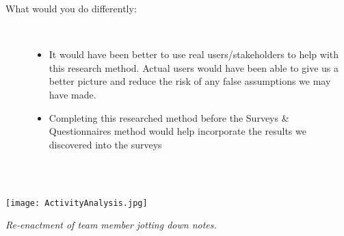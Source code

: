 \documentclass{article}
\begin{document}
\begin{description}
    \item[What would you do differently:]
    \newline \,
    \begin{itemize}
        \item It would have been better to use real users/stakeholders to help with this research 
        method. Actual users would have been able to give us a better picture and reduce the risk of 
        any false assumptions we may have made. 
        \item Completing this researched method before the Surveys & Questionnaires method would help 
        incorporate the results we discovered into the surveys
    \end{itemize}
\end{description}
\\~\\
\begin{center}
    \texttt{[image: ActivityAnalysis.jpg]}
\end{center}
\begin{center}
    \textit{Re-enactment of team member jotting down notes.}
\end{center}

\newpage
\end{document}
